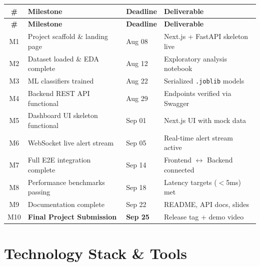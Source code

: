 \documentclass[11pt, a4paper]{article}
\begin{document}
\noindent
\small
\begin{longtable}{|c|p{}|l|p{}|}
\hline
\rowcolor{primary!10}
\textbf{\#} & \textbf{Milestone} & \textbf{Deadline} & \textbf{Deliverable} \\
\hline
\endfirsthead
\hline
\rowcolor{primary!10}
\textbf{\#} & \textbf{Milestone} & \textbf{Deadline} & \textbf{Deliverable} \\
\hline
\endhead
M1 & Project scaffold \& landing page & Aug 08 & Next.js + FastAPI skeleton live \\
M2 & Dataset loaded \& EDA complete & Aug 12 & Exploratory analysis notebook \\
M3 & ML classifiers trained & Aug 22 & Serialized \texttt{.joblib} models \\
M4 & Backend REST API functional & Aug 29 & Endpoints verified via Swagger \\
M5 & Dashboard UI skeleton functional & Sep 01 & Next.js UI with mock data \\
M6 & WebSocket live alert stream & Sep 05 & Real-time alert stream active \\
M7 & Full E2E integration complete & Sep 14 & Frontend $\longleftrightarrow$ Backend connected \\
M8 & Performance benchmarks passing & Sep 18 & Latency targets ($<$5ms) met \\
M9 & Documentation complete & Sep 22 & README, API docs, slides \\
\rowcolor{danger!8}
M10 & \textbf{Final Project Submission} & \textbf{Sep 25} & Release tag + demo video \\
\hline
\end{longtable}
\normalsize

\section{Technology Stack \& Tools}
\label{sec:techstack}
\end{document}
